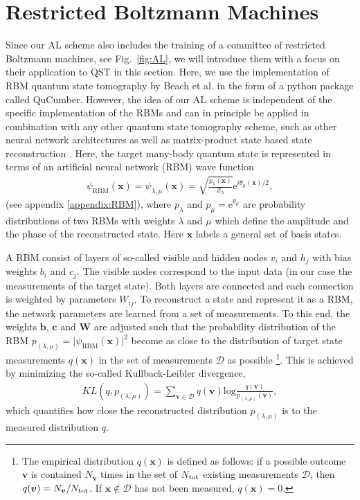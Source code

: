 \documentclass[pra,aps,showpacs,groupedaddress,superscriptaddress,twocolumn,toc=flat,biblatex,footinbib]{revtex4-1}
\renewcommand{\vec}[1]{\bm{#1}}
\begin{document}
\section{Restricted Boltzmann Machines}

Since our AL scheme also includes the training of a committee of restricted Boltzmann machines, see Fig.~\ref{fig:AL}, we will introduce them with a focus on their application to QST in this section. Here, we use the implementation of RBM quantum state tomography by Beach et al. \cite{Beach2019} in the form of a python package called QuCumber. However, the idea of our AL scheme is independent of the specific implementation of the RBMs and can in principle be applied in combination with any other quantum state tomography scheme, such as other neural network architectures \cite{Rocchetto2018,Morawetz2021,Schmale2021,Ahmed2021,Cha2021} as well as matrix-product state based state reconstruction \cite{Cramer2010,Baumgratz2013}.
Here, the target many-body quantum state is represented in terms of an artificial neural network (RBM) wave function
\begin{align}
\psi_{\mathrm{RBM}}(\vec{x})=\psi_{\lambda, \mu}(\vec{x}) = \sqrt{\frac{p_\lambda(\vec{x})}{Z_\lambda}}\mathrm{e}^{i\theta_\mu(\vec{x})/2},
\label{eq:RBMstate}
\end{align}
(see appendix \ref{appendix:RBM}), where $p_\lambda$ and $p_{\mu}=\mathrm{e}^{ \theta _{\mu}}$ are probability distributions of two RBMs with weights $\lambda$ and $\mu$ which define the amplitude and the phase of the reconstructed state. Here $\vec{x}$ labels a general set of basis states. 

A RBM consist of layers of so-called visible and hidden nodes $v_i$ and $h_j$ with bias weights $b_i$ and $c_j$. The visible nodes correspond to the input data (in our case the measurements of the target state). Both layers are connected and each connection is weighted by parameters $W_{ij}$. To reconstruct a state and represent it as a RBM, the network parameters are learned from a set of measurements. To this end, the weights $\vec{b}, \,\vec{c}$ and $\vec{W}$ are adjusted such that the probability distribution of the RBM $p_{(\lambda, \mu)}=\vert \psi_{\mathrm{RBM}}(\vec{x})\vert ^2$ become as close to the distribution of target state measurements $q(\vec{x})$ in the set of measurements $\mathcal{D}$ as possible \footnote{The empirical distribution $q(\vec{x})$ is defined as follows: if a possible outcome $\vec{v}$ is contained $N_{\vec{v}}$ times in the set of $N_{\rm tot}$ existing measurements $\mathcal{D}$, then $q(\vec{v}) = N_{\vec{v}}/N_{\rm tot}$. If $\vec{x} \notin \mathcal{D}$ has not been measured, $q(\vec{x})=0$.}. This is achieved by minimizing the so-called Kullback-Leibler divergence,
\begin{align}
KL(q, p_{(\lambda, \mu)}) = \sum_{\vec{v} \in \mathcal{D}}q(\vec{v})\mathrm{log}\frac{q(\vec{v})}{p_{(\lambda, \mu)}(\vec{v})},
\label{eq:KL}
\end{align}
which quantifies how close the reconstructed distribution $p_{(\lambda, \mu)}$ is to the measured distribution $q$.
\end{document}
